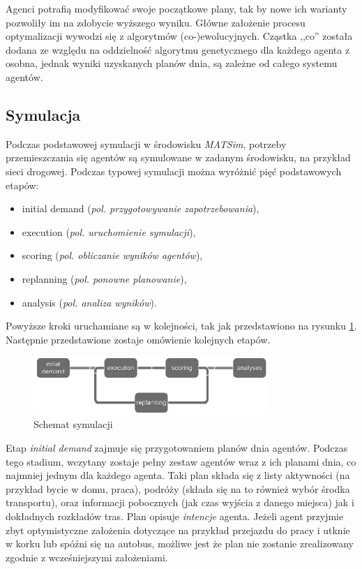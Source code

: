 \documentclass[twoside,12pt]{report}
\begin{document}
Agenci potrafią modyfikować swoje początkowe plany, tak by nowe ich warianty pozwoliły im na zdobycie wyższego wyniku. Główne założenie procesu optymalizacji wywodzi się z algorytmów (co-)ewolucyjnych. Cząstka ,,co'' została dodana ze względu na oddzielność algorytmu genetycznego dla każdego agenta z osobna, jednak wyniki uzyskanych planów dnia, są zależne od całego systemu agentów. 

\subsection{Symulacja}\label{rozdz.symulacja}

Podczas podstawowej symulacji w środowisku \textit{MATSim}, potrzeby przemieszczania się agentów są symulowane w zadanym środowisku, na przykład sieci drogowej. Podczas typowej symulacji można wyróżnić pięć podstawowych etapów:

\begin{itemize}
\item initial demand (\textit{pol. przygotowywanie zapotrzebowania}),
\item execution (\textit{pol. uruchomienie symulacji}),
\item scoring (\textit{pol. obliczanie wyników agentów}),
\item replanning (\textit{pol. ponowne planowanie}),
\item analysis (\textit{pol. analiza wyników}).
\end{itemize}

Powyższe kroki uruchamiane są w kolejności, tak jak przedstawiono na rysunku \ref{fig:schemat_symulacji}. Następnie przedstawione zostaje omówienie kolejnych etapów.

\begin{figure}[htbp]
	\centering
	\includegraphics[width=0.8\textwidth]{img/simulation_stages}
	\caption{Schemat symulacji}
	\label{fig:schemat_symulacji}
\end{figure}

Etap \textit{initial demand} zajmuje się przygotowaniem planów dnia agentów. Podczas tego stadium, wczytany zostaje pełny zestaw agentów wraz z ich planami dnia, co najmniej jednym dla każdego agenta. Taki plan składa się z listy aktywności (na przykład bycie w domu, praca), podróży (składa się na to również wybór środka transportu), oraz informacji pobocznych (jak czas wyjścia z danego miejsca) jak i dokładnych rozkładów tras. Plan opisuje \textit{intencje} agenta. Jeżeli agent przyjmie zbyt optymistyczne założenia dotyczące na przykład przejazdu do pracy i utknie w korku lub spóźni się na autobus, możliwe jest że plan nie zostanie zrealizowany zgodnie z wcześniejszymi założeniami.
\end{document}
